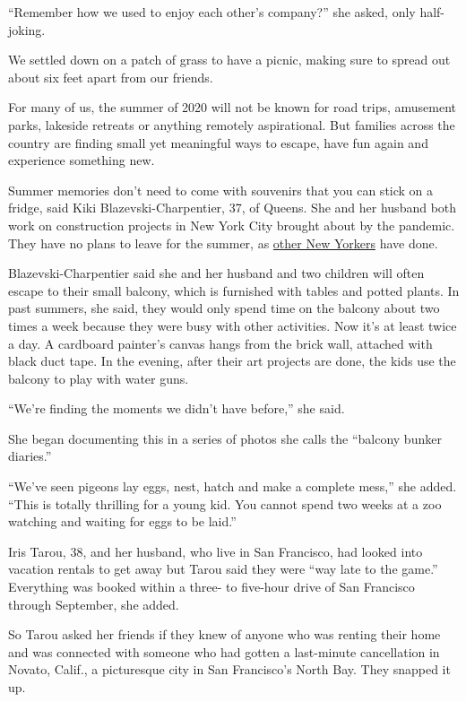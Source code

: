 ``Remember how we used to enjoy each other's company?'' she asked, only
half-joking.

We settled down on a patch of grass to have a picnic, making sure to
spread out about six feet apart from our friends.

For many of us, the summer of 2020 will not be known for road trips,
amusement parks, lakeside retreats or anything remotely aspirational.
But families across the country are finding small yet meaningful ways to
escape, have fun again and experience something new.

Summer memories don't need to come with souvenirs that you can stick on
a fridge, said Kiki Blazevski-Charpentier, 37, of Queens. She and her
husband both work on construction projects in New York City brought
about by the pandemic. They have no plans to leave for the summer, as
\href{https://www.nytimes3xbfgragh.onion/interactive/2020/05/16/nyregion/nyc-coronavirus-moving-leaving.html}{other
New Yorkers} have done.

Blazevski-Charpentier said she and her husband and two children will
often escape to their small balcony, which is furnished with tables and
potted plants. In past summers, she said, they would only spend time on
the balcony about two times a week because they were busy with other
activities. Now it's at least twice a day. A cardboard painter's canvas
hangs from the brick wall, attached with black duct tape. In the
evening, after their art projects are done, the kids use the balcony to
play with water guns.

``We're finding the moments we didn't have before,'' she said.

She began documenting this in a series of photos she calls the ``balcony
bunker diaries.''

``We've seen pigeons lay eggs, nest, hatch and make a complete mess,''
she added. ``This is totally thrilling for a young kid. You cannot spend
two weeks at a zoo watching and waiting for eggs to be laid.''

Iris Tarou, 38, and her husband, who live in San Francisco, had looked
into vacation rentals to get away but Tarou said they were ``way late to
the game.'' Everything was booked within a three- to five-hour drive of
San Francisco through September, she added.

So Tarou asked her friends if they knew of anyone who was renting their
home and was connected with someone who had gotten a last-minute
cancellation in Novato, Calif., a picturesque city in San Francisco's
North Bay. They snapped it up.

